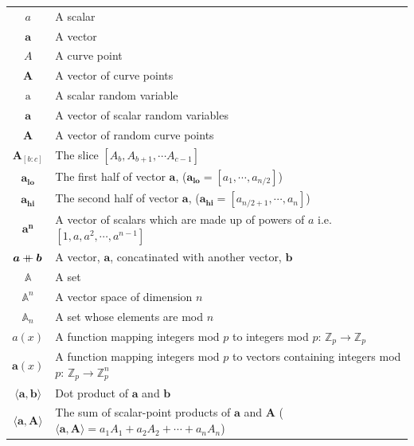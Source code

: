 \documentclass{article}
\renewcommand{\vec}[1]{\boldsymbol{#1}}
\newcommand{\ran}[1]{\mathrm{#1}}
\newcommand{\vecran}[1]{\mathbf{#1}}
\newcommand{\Z}{\mathbb{Z}}
\newcommand\concat{\mathbin{+\mkern-10mu+}} %
\newcommand{\dotp}[2]{\langle #1, #2 \rangle}
\newcommand{\opn}[1]{\operatorname{#1}}
\newcommand{\veclo}[1]{\vec{#1_{\opn{lo}}}}
\newcommand{\vechi}[1]{\vec{#1_{\opn{hi}}}}
\begin{document}
\begin{center}
\begin{tabular}{ c l }
	$a$                         & A scalar \\
	$\vec{a}$                   & A vector \\
	$A$                         & A curve point \\
	$\vec{A}$                   & A vector of curve points \\
	$\ran{a}$                   & A scalar random variable \\
	$\vecran{a}$                & A vector of scalar random variables \\
	$\vecran{A}$                & A vector of random curve points \\
	$\vec{A}_{[b : c]}$            & The slice $[A_b, A_{b+1}, \cdots  A_{c-1}]$ \\ 
	$\veclo{a}$                 & The first half of vector $\vec{a}$, ($\veclo{a} = [a_{1}, \cdots, a_{n/2}]$) \\
	$\vechi{a}$                 & The second half of vector $\vec{a}$, ($\vechi{a} = [a_{n/2+1}, \cdots, a_{n}]$) \\
	$\vec{a^n}$                 & A vector of scalars which are made up of powers of $a$ i.e. $[1,a,a^2, \cdots, a^{n-1}]$\\
	$\vec{a} \concat \vec{b}$   & A vector, $\vec{a}$, concatinated with another vector, $\vec{b}$\\
	$\mathbb{A}$                & A set \\
	$\mathbb{A}^n$              & A vector space of dimension $n$ \\ 
	$\mathbb{A}_n$              & A set whose elements are mod $n$ \\ 
	$a(x)$                      & A function mapping integers mod $p$ to integers mod $p$: $\Z_p \rightarrow \Z_p$ \\
	$\vec{a}(x)$                & A function mapping integers mod $p$ to vectors containing integers mod $p$: $\Z_p \rightarrow \Z^n_p$ \\
	$\dotp{\vec{a}}{\vec{b}}$   & Dot product of $\vec{a}$ and $\vec{b}$ \\
	$\dotp{\vec{a}}{\vec{A}}$   & The sum of scalar-point products of $\vec{a}$ and $\vec{A}$ ($\dotp{\vec{a}}{\vec{A}} = a_1 A_1 + a_2 A_2 + \cdots + a_n A_n$) \\
\end{tabular}
\end{center}
\end{document}
